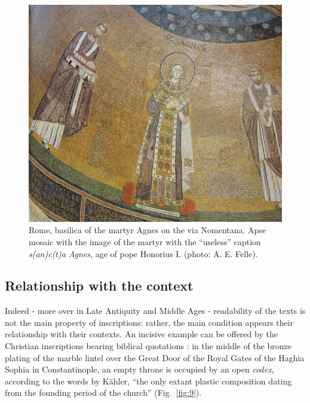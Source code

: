 \documentclass[amsthm,ebook]{saparticle}
\begin{document}
\begin{figure}[!hbp]
\centering
 \includegraphics[width=\columnwidth]{FelleVisualFeaturesofinscriptionsEAGLE2016FullPaper-img011.jpg}
\caption{Rome, basilica of the martyr Agnes on the via Nomentana. Apse mosaic with the image of the martyr with the
``useless'' caption  \emph{s(an)c(t)a Agnes}, age of pope Honorius I. (photo: A. E. Felle).}
\label{fig:8}
\end{figure}


\subsection{Relationship with the context}

\noindent Indeed - more over in Late Antiquity and Middle Ages - readability of the texts is not the main property of
inscriptions: rather, the main condition appears their relationship with their contexts. An incisive example can be
offered by the Christian inscriptions bearing biblical quotations \citep{felle_biblia_2006}: in the middle of the bronze
plating of the marble lintel over the Great Door of the Royal Gates of the Haghia Sophia in Constantinople, an empty
throne is occupied by an open \emph{codex}, according to the words by Kähler, ``the only extant plastic
composition dating from the founding period of the church'' \citep[29-30; 32][taff. 22; 62]{kahler_hagia_1967}
(Fig.~\ref{fig:9}).
\end{document}
